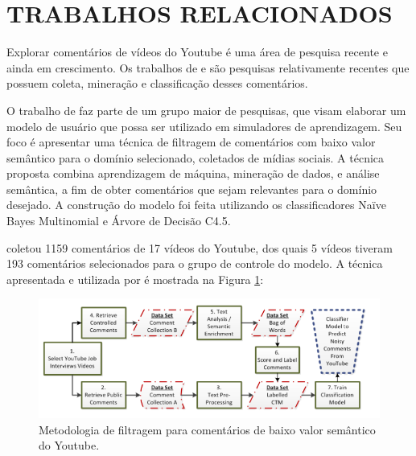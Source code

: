 \newpage
\section{TRABALHOS RELACIONADOS}

Explorar comentários de vídeos do Youtube é uma área de pesquisa recente e ainda em crescimento. Os trabalhos de  e \cite{schultes2013leave} são pesquisas relativamente recentes que possuem coleta, mineração e classificação desses comentários.

O trabalho de \cite{ammari2011filteringYt} faz parte de um grupo maior de pesquisas, que visam elaborar um modelo de usuário que possa ser utilizado em simuladores de aprendizagem. Seu foco é apresentar uma técnica de filtragem de comentários com baixo valor semântico para o domínio selecionado, coletados de mídias sociais. A técnica proposta combina aprendizagem de máquina, mineração de dados, e análise semântica, a fim de obter comentários que sejam relevantes para o domínio desejado. A construção do modelo foi feita utilizando os classificadores Naïve Bayes Multinomial e Árvore de Decisão C4.5.

\cite{ammari2011filteringYt} coletou 1159 comentários de 17 vídeos do Youtube, dos quais 5 vídeos tiveram 193 comentários selecionados para o grupo de controle do modelo. A técnica apresentada e utilizada por \cite{ammari2011filteringYt} é mostrada na Figura \ref{fig:ammari-metodologia}:

\begin{figure}[H] %
	\caption{\label{fig:ammari-metodologia} Metodologia de filtragem para comentários de baixo valor semântico do Youtube.}
	\begin{center}
	    \includegraphics[scale=0.8]{figuras/figura_3.PNG} %
	\end{center}
\end{figure}

